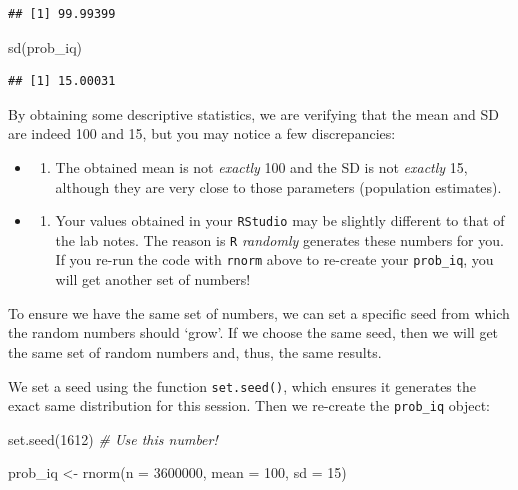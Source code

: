 \documentclass[
]{book}
\newenvironment{Shaded}{\begin{snugshade}}{\end{snugshade}}
\newcommand{\AttributeTok}[1]{\textcolor[rgb]{0.77,0.63,0.00}{#1}}
\newcommand{\CommentTok}[1]{\textcolor[rgb]{0.56,0.35,0.01}{\textit{#1}}}
\newcommand{\DecValTok}[1]{\textcolor[rgb]{0.00,0.00,0.81}{#1}}
\newcommand{\FunctionTok}[1]{\textcolor[rgb]{0.00,0.00,0.00}{#1}}
\newcommand{\NormalTok}[1]{#1}
\newcommand{\OtherTok}[1]{\textcolor[rgb]{0.56,0.35,0.01}{#1}}
\providecommand{\tightlist}{%
  \setlength{\itemsep}{0pt}\setlength{\parskip}{0pt}}
\begin{document}
\begin{verbatim}
## [1] 99.99399
\end{verbatim}

\begin{Shaded}
\begin{Highlighting}[]
\FunctionTok{sd}\NormalTok{(prob\_iq) }
\end{Highlighting}
\end{Shaded}

\begin{verbatim}
## [1] 15.00031
\end{verbatim}

By obtaining some descriptive statistics, we are verifying that the mean and SD are indeed 100 and 15, but you may notice a few discrepancies:

\begin{itemize}
\item
  \begin{enumerate}
  \def\labelenumi{\arabic{enumi}.}
  \tightlist
  \item
    The obtained mean is not \emph{exactly} 100 and the SD is not \emph{exactly} 15, although they are very close to those parameters (population estimates).
  \end{enumerate}
\item
  \begin{enumerate}
  \def\labelenumi{\arabic{enumi}.}
  \setcounter{enumi}{1}
  \tightlist
  \item
    Your values obtained in your \texttt{RStudio} may be slightly different to that of the lab notes. The reason is \texttt{R} \emph{randomly} generates these numbers for you. If you re-run the code with \texttt{rnorm} above to re-create your \texttt{prob\_iq}, you will get another set of numbers!
  \end{enumerate}
\end{itemize}

To ensure we have the same set of numbers, we can set a specific seed from which the random numbers should `grow'. If we choose the same seed, then we will get the same set of random numbers and, thus, the same results.

We set a seed using the function \texttt{set.seed()}, which ensures it generates the exact same distribution for this session. Then we re-create the \texttt{prob\_iq} object:

\begin{Shaded}
\begin{Highlighting}[]
\FunctionTok{set.seed}\NormalTok{(}\DecValTok{1612}\NormalTok{) }\CommentTok{\# Use this number! }

\NormalTok{prob\_iq }\OtherTok{\textless{}{-}} \FunctionTok{rnorm}\NormalTok{(}\AttributeTok{n =} \DecValTok{3600000}\NormalTok{, }\AttributeTok{mean =} \DecValTok{100}\NormalTok{, }\AttributeTok{sd =} \DecValTok{15}\NormalTok{)}
\end{Highlighting}
\end{Shaded}
\end{document}
